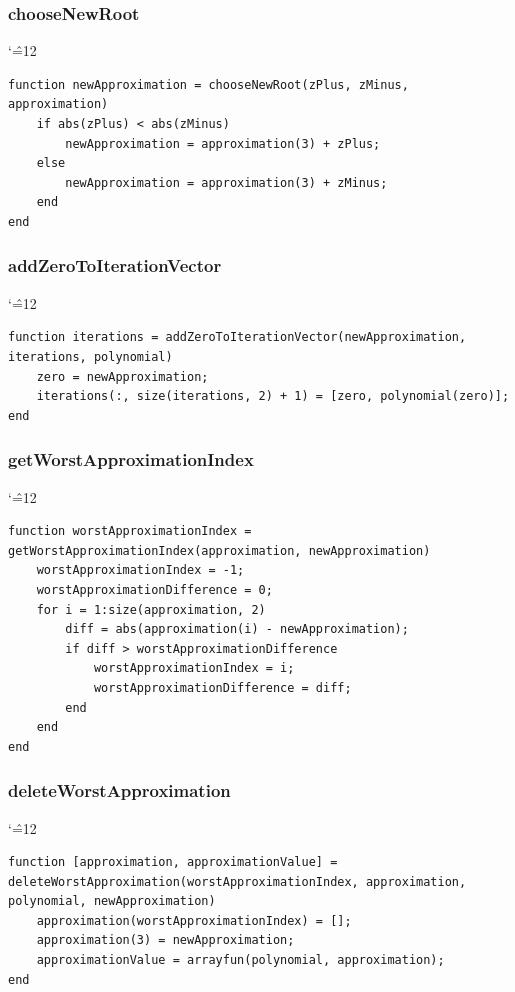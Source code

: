 \documentclass[12pt]{report}
\newenvironment{simplechar}{%
   \catcode`\^=12
}{}
\begin{document}
\subsubsection{chooseNewRoot}
\begin{simplechar}
\begin{lstlisting}
function newApproximation = chooseNewRoot(zPlus, zMinus, approximation)
    if abs(zPlus) < abs(zMinus)
        newApproximation = approximation(3) + zPlus;
    else
        newApproximation = approximation(3) + zMinus;
    end
end
\end{lstlisting}
\end{simplechar}

\subsubsection{addZeroToIterationVector}
\begin{simplechar}
\begin{lstlisting}
function iterations = addZeroToIterationVector(newApproximation, iterations, polynomial)
    zero = newApproximation;
    iterations(:, size(iterations, 2) + 1) = [zero, polynomial(zero)];
end
\end{lstlisting}
\end{simplechar}

\subsubsection{getWorstApproximationIndex}
\begin{simplechar}
\begin{lstlisting}
function worstApproximationIndex = getWorstApproximationIndex(approximation, newApproximation)
    worstApproximationIndex = -1;
    worstApproximationDifference = 0;
    for i = 1:size(approximation, 2)
        diff = abs(approximation(i) - newApproximation);
        if diff > worstApproximationDifference
            worstApproximationIndex = i;
            worstApproximationDifference = diff;
        end
    end
end
\end{lstlisting}
\end{simplechar}

\subsubsection{deleteWorstApproximation}
\begin{simplechar}
\begin{lstlisting}
function [approximation, approximationValue] = deleteWorstApproximation(worstApproximationIndex, approximation, polynomial, newApproximation)
    approximation(worstApproximationIndex) = [];
    approximation(3) = newApproximation;
    approximationValue = arrayfun(polynomial, approximation);
end
\end{lstlisting}
\end{simplechar}
\end{document}
